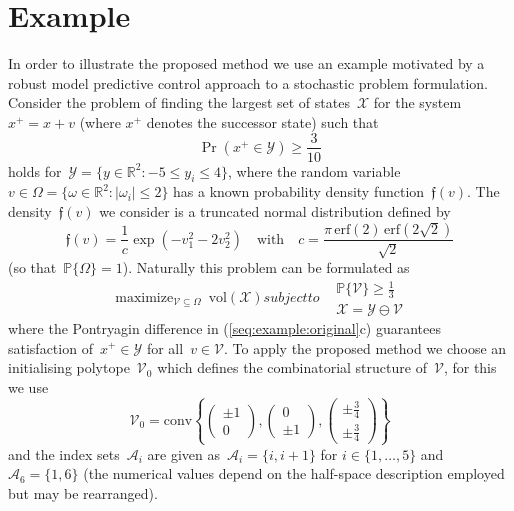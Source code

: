 \documentclass[letterpaper, 10pt, conference]{ieeeconf} %
\providecommand{\abs}[1]{\left\lvert#1\right\rvert}
\providecommand{\conv}{\text{conv}}
\DeclareMathOperator*{\maximize}{maximize}
\begin{document}
\section{Example}\label{sec:example}
%
%
\noindent In order to illustrate the proposed method we use an example motivated by a robust model predictive control approach to a stochastic problem formulation.
%
Consider the problem of finding the largest set of states~$\mathcal X$ for the system~$x^+=x+v$ (where $x^+$ denotes the successor state) such that
\[
\Pr (x^+\in\mathcal Y) \geq \frac{3}{10}
\]
holds for~$\mathcal Y = \{y\in\mathbb R^2:-5\leq y_i\leq 4\}$, where the random variable~$v\in\Omega=\{\omega\in\mathbb R^2:\abs{\omega_i}\leq2\}$ has a known probability density function~$\mathfrak f(v)$.
%
The density~$\mathfrak f(v)$ we consider is a truncated normal distribution defined by
\[
\mathfrak f(v) = \frac{1}{c}\exp(-v_1^2-2v_2^2)
\quad \text{with} \quad
c=\frac{\pi\,\text{erf}(2)\,\text{erf}(2\sqrt{2})}{\sqrt 2}
\]
(so that~$\mathbb P\{\Omega\}=1$).
%
Naturally this problem can be formulated as
%
\begin{subequations}\label{seq:example:original}
\begin{equation}
	\maximize_{\mathcal V \subseteq\Omega} \ \text{vol}(\mathcal X)
\end{equation}
subject to
\begin{align}
	&\mathbb P\{\mathcal V\}\geq \frac{1}{3} \\
	&\mathcal X = \mathcal Y\ominus \mathcal V
\end{align}
\end{subequations}
%
where the Pontryagin difference in (\ref{seq:example:original}c) guarantees satisfaction of~$x^+\in\mathcal Y$ for all~$v\in\mathcal V$.
%
To apply the proposed method we choose an initialising polytope~$\mathcal V_0$ which defines the combinatorial structure of~$\mathcal V$, for this we use 
%
\[
\mathcal V_0 = \conv\left\{\begin{pmatrix}\pm 1\\0 \end{pmatrix},\begin{pmatrix}0\\\pm1\end{pmatrix},\begin{pmatrix}\pm\frac{3}{4}\\\pm\frac{3}{4}\end{pmatrix}\right\}
\]
%
and the index sets~$\mathcal A_i$ are given as~$\mathcal A_i=\{i,i+1\}$ for $i\in\{1,\dots,5\}$ and~$\mathcal A_6=\{1,6\}$ (the numerical values depend on the half-space description employed but may be rearranged).
%
\end{document}
